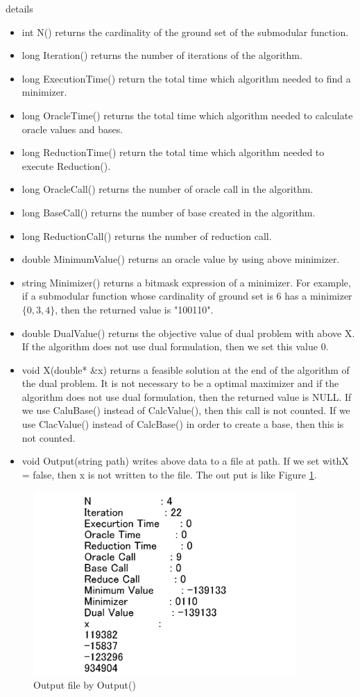 \documentclass{article}
\begin{document}
{\sf details}
\begin{itemize}
\item int N() returns the cardinality of the ground set of the submodular function.
\item long Iteration() returns the number of iterations of the algorithm.
\item long ExecutionTime() return the total time which algorithm needed to find a minimizer.
\item long OracleTime() returns the total time which algorithm needed to calculate oracle values and bases.
\item long ReductionTime() return the total time which algorithm needed to execute Reduction().
\item long OracleCall() returns the number of oracle call in the algorithm.
\item long BaseCall() returns the number of base created in the algorithm.
\item long ReductionCall() returns the number of reduction call.
\item double MinimumValue() returns an oracle value by using above minimizer.
\item string Minimizer() returns a bitmask expression of a minimizer.
For example, if a submodular function whose cardinality of ground set is $6$
has a minimizer $\{ 0,3,4\}$,
then the returned value is "100110".
\item double DualValue() returns the objective value of dual problem with above X.
If the algorithm does not use dual formulation, then we set this value $0$.
\item void X(double* \&x) returns a feasible solution at the end of the algorithm of the dual problem.
It is not necessary to be a optimal maximizer and if the algorithm does not use dual formulation, then the returned value is NULL.
If we use CaluBase() instead of CalcValue(), then this call is not counted.
If we use ClacValue() instead of CalcBase() in order to create a base,
then this is not counted.
\item void Output(string path) writes above data to a file at path.
If we set withX = false, then x is not written to the file.
The out put is like Figure \ref{outputSFMResult}.
\end{itemize}

\begin{figure}[h!]\label{outputSFMResult}
{
\fontsize{10pt}{12pt}\selectfont
\centering
\includegraphics[height=7.0cm]{picture/SFMResult.png}
\caption{Output file by Output()}
}
\end{figure}
\end{document}

